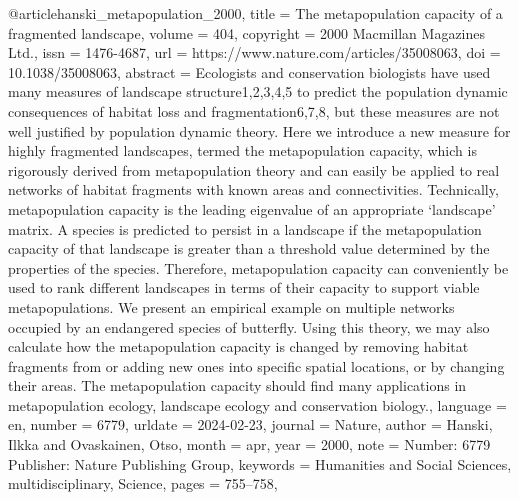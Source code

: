{{{{@article{hanski_metapopulation_2000,
	title = {The metapopulation capacity of a fragmented landscape},
	volume = {404},
	copyright = {2000 Macmillan Magazines Ltd.},
	issn = {1476-4687},
	url = {https://www.nature.com/articles/35008063},
	doi = {10.1038/35008063},
	abstract = {Ecologists and conservation biologists have used many measures of landscape structure1,2,3,4,5 to predict the population dynamic consequences of habitat loss and fragmentation6,7,8, but these measures are not well justified by population dynamic theory. Here we introduce a new measure for highly fragmented landscapes, termed the metapopulation capacity, which is rigorously derived from metapopulation theory and can easily be applied to real networks of habitat fragments with known areas and connectivities. Technically, metapopulation capacity is the leading eigenvalue of an appropriate ‘landscape’ matrix. A species is predicted to persist in a landscape if the metapopulation capacity of that landscape is greater than a threshold value determined by the properties of the species. Therefore, metapopulation capacity can conveniently be used to rank different landscapes in terms of their capacity to support viable metapopulations. We present an empirical example on multiple networks occupied by an endangered species of butterfly. Using this theory, we may also calculate how the metapopulation capacity is changed by removing habitat fragments from or adding new ones into specific spatial locations, or by changing their areas. The metapopulation capacity should find many applications in metapopulation ecology, landscape ecology and conservation biology.},
	language = {en},
	number = {6779},
	urldate = {2024-02-23},
	journal = {Nature},
	author = {Hanski, Ilkka and Ovaskainen, Otso},
	month = apr,
	year = {2000},
	note = {Number: 6779
Publisher: Nature Publishing Group},
	keywords = {Humanities and Social Sciences, multidisciplinary, Science},
	pages = {755--758},
}

}}}}
